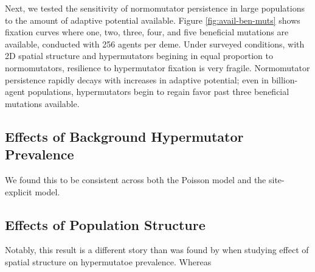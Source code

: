 

Next, we tested the sensitivity of normomutator persistence in large populations to the amount of adaptive potential available.
Figure \ref{fig:avail-ben-muts} shows fixation curves where one, two, three, four, and five beneficial mutations are available, conducted with 256 agents per deme.
Under surveyed conditions, with 2D spatial structure and hypermutators begining in equal proportion to normomutators, resilience to hypermutator fixation is very fragile.
Normomutator persistence rapidly decays with increases in adaptive potential;
even in billion-agent populations, hypermutators begin to regain favor past three beneficial mutations available.

\subsection{Effects of Background Hypermutator Prevalence}
\label{sec:background-hypermutator-prevalence}



We found this to be consistent across both the Poisson model and the site-explicit model.

\subsection{Effects of Population Structure}
\label{sec:population-structure}



Notably, this result is a different story than was found by \citet{raynes2019migration} when studying effect of spatial structure on hypermutatoe prevalence.
Whereas
